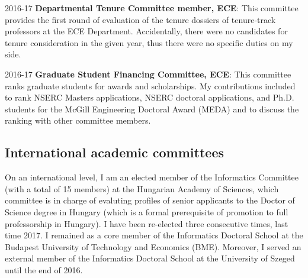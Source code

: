 \begin{yearlist}
\item[2016-17] \textbf{Departmental Tenure Committee member, ECE}: This committee provides the first round of evaluation of the tenure dossiers of tenure-track professors at the ECE Department. Accidentally, there were no candidates for tenure consideration in the given year, thus there were no specific duties on my side. 
\item[2016-17] \textbf{Graduate Student Financing Committee, ECE}: This committee ranks graduate students for awards and scholarships. My contributions included to rank NSERC Masters applications, NSERC doctoral applications, and Ph.D. students for the McGill Engineering Doctoral Award (MEDA) and to discuss the ranking with other committee members.
\end{yearlist}

\subsection{International academic committees}
On an international level, I am an elected member of the Informatics Committee (with a total of 15 members) at the Hungarian Academy of Sciences, which committee is in charge of evaluting profiles of senior applicants to the Doctor of Science degree in Hungary (which is a formal prerequisite of promotion to full professorship in Hungary). I have been re-elected three consecutive times, last time 2017. I remained as a core member of the Informatics Doctoral School at the Budapest University of Technology and Economics (BME). Moreover, I served an external member of the Informatics Doctoral School at the University of Szeged until the end of 2016.


 
